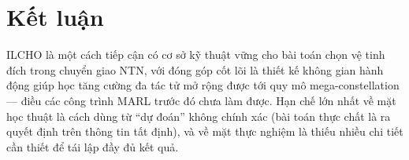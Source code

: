 \documentclass[12pt,a4paper]{article}
\begin{document}
\section{Kết luận}

ILCHO là một cách tiếp cận có cơ sở kỹ thuật vững cho bài toán chọn vệ tinh đích trong chuyển
giao NTN, với đóng góp cốt lõi là thiết kế không gian hành động giúp học tăng cường đa tác tử
mở rộng được tới quy mô mega-constellation — điều các công trình MARL trước đó chưa làm được.
Hạn chế lớn nhất về mặt học thuật là cách dùng từ ``dự đoán'' không chính xác (bài toán thực
chất là ra quyết định trên thông tin tất định), và về mặt thực nghiệm là thiếu nhiều chi tiết
cần thiết để tái lập đầy đủ kết quả.
\end{document}
